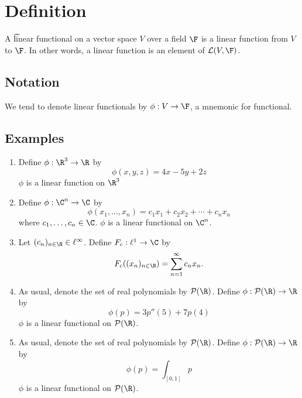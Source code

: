 
\section*{Definition}

A \t{linear functional} on a vector space $V$ over a field $\F $ is a linear function from $V$ to $\F $.
In other words, a linear function is an element of $\mathcal{L} (V, \F )$.

\subsection*{Notation}

We tend to denote linear functionals by $\phi : V \to \F $, a mnemonic for functional.

\subsection*{Examples}

\begin{enumerate}
  \item Define $\phi : \R ^3 \to \R $ by
\[
\phi (x, y, z) = 4x - 5y + 2z
\]
$\phi $ is a linear function on $\R ^3$
  \item Define $\phi : \C ^n \to \C $ by
\[
\phi (x_1, \dots , x_n) = c_1x_1 + c_2x_2 + \cdots + c_nx_n
\]
where $c_1, \dots , c_n \in \C $.
$\phi $ is a linear functional on $\C ^n$.
  \item Let $(c_n)_{n \in \N  } \in \ell ^{\infty}$. Define $F_c: \ell ^1 \to \C $ by
\[
F_c((x_n)_{n \in \N  }) = \sum_{n = 1}^{\infty} c_n x_n.
\]
  \item As usual, denote the set of real polynomials by $\mathcal{P} (\R )$.
Define $\phi : \mathcal{P} (\R ) \to \R $ by
\[
\phi (p) = 3p''(5) + 7p(4)
\]
$\phi $ is a linear functional on $\mathcal{P} (\R )$.
  \item As usual, denote the set of real polynomials by $\mathcal{P} (\R )$.
Define $\phi : \mathcal{P} (\R ) \to \R $ by
\[
\phi (p) = \int _{[0,1]} p
\]
$\phi $ is a linear functional on $\mathcal{P} (\R )$.
\end{enumerate}
\blankpage